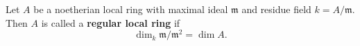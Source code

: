 Let $A$ be a noetherian local ring with maximal ideal $\mathfrak{m}$ and residue field $k = A/\mathfrak{m}$. Then $A$ is called a \textbf{regular local ring} if
$$\dim_k \mathfrak{m}/\mathfrak{m}^2 = \dim A.$$

